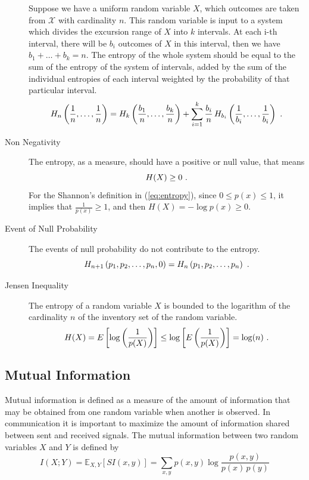 \begin{description}
Suppose we have a uniform random variable $X$, which outcomes are taken from $\mathcal{X}$ with cardinality $n$. 
This random variable is input to a system which divides the excursion range of $X$ into $k$ intervals. 
At each i-th interval, there will be $b_i$ outcomes of $X$ in this interval, then we have $b_1 + \ldots + b_k = n$. 
The entropy of the whole system should be equal to the sum of the entropy of the system of intervals, 
added by the sum of the individual entropies of each interval weighted by the probability of that particular interval.
\begin{equation}
H_n\left(\frac{1}{n}, \ldots, \frac{1}{n}\right) = H_k\left(\frac{b_1}{n}, \ldots, \frac{b_k}{n}\right) + \sum_{i=1}^k \frac{b_i}{n} \, H_{b_i}\left(\frac{1}{b_i}, \ldots, \frac{1}{b_i}\right) \textmd{ .}
\label{eq:entropy-additivity}
\end{equation}

\item[Non Negativity]
The entropy, as a measure, should have a positive or null value, that means
\begin{equation}
H(X) \geq 0 \textmd{ .}
\label{eq:entropy-non-negativity}
\end{equation}
For the Shannon's definition in (\ref{eq:entropy}), since $0 \leq p(x) \leq 1$, 
it implies that $\frac{1}{p(x)} \geq 1$, and then $H(X) = - \log p(x) \geq 0$.

\item[Event of Null Probability]
The events of null probability do not contribute to the entropy.
\begin{equation}
H_{n+1}\left(p_1, p_2, \ldots, p_n, 0 \right) = H_{n}\left(p_1, p_2, \ldots, p_n \right) \textmd{ .}
\label{eq:entropy-null-event}
\end{equation}

\item[Jensen Inequality]
The entropy of a random variable $X$ is bounded to the logarithm of the cardinality $n$ of 
the inventory set of the random variable.
\begin{equation}
H(X) = E \left[ \log \left( \frac{1}{p(X)} \right) \right] \leq 
\log \left[ E \left( \frac{1}{p(X)} \right) \right] = \log (n) \textmd{ .}
\label{eq:entropy-jensen}
\end{equation}

\end{description}



\subsection{Mutual Information}
Mutual information is defined as a measure of the amount of information that may be obtained from one random
variable when another is observed. In communication it is important to maximize the amount 
of information shared between sent and received signals. The mutual information between two
random variables $X$ and $Y$ is defined by
\begin{equation}
I(X;Y) = \mathbb{E}_{X,Y} [SI(x,y)] = \sum_{x,y} p(x,y) \log \frac{p(x,y)}{p(x)\, p(y)}
\end{equation}

